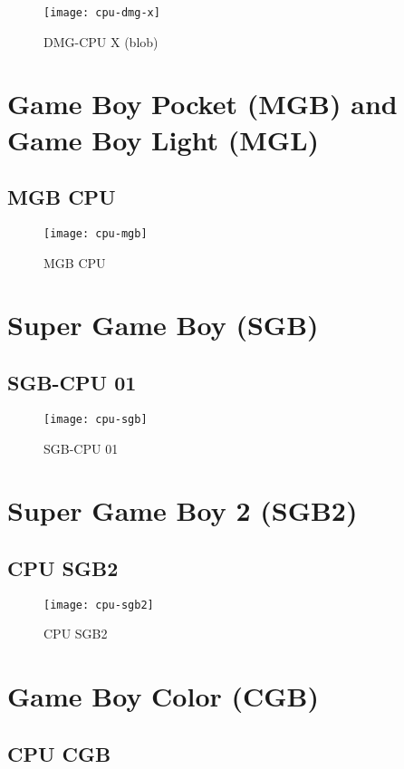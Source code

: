 \begin{figure}[H]
  \centering
  \texttt{[image: cpu-dmg-x]}
  \caption{DMG-CPU X (blob)}
\end{figure}

\section{Game Boy Pocket (MGB) and Game Boy Light (MGL)}

\subsection{MGB CPU}

\begin{figure}[H]
  \centering
  \texttt{[image: cpu-mgb]}
  \caption{MGB CPU}
\end{figure}

\section{Super Game Boy (SGB)}

\subsection{SGB-CPU 01}

\begin{figure}[H]
  \centering
  \texttt{[image: cpu-sgb]}
  \caption{SGB-CPU 01}
\end{figure}

\section{Super Game Boy 2 (SGB2)}

\subsection{CPU SGB2}

\begin{figure}[H]
  \centering
  \texttt{[image: cpu-sgb2]}
  \caption{CPU SGB2}
\end{figure}

\section{Game Boy Color (CGB)}

\subsection{CPU CGB}


